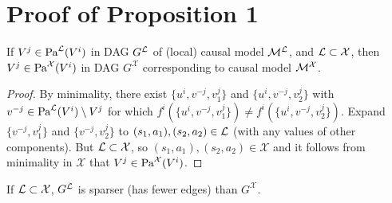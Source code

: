 \documentclass[coda.tex]{subfiles}
\begin{document}
\appendix

\section{Proof of Proposition 1}\label{appdx_proposition}

\begin{lemma}
If $V^j \in \textrm{Pa}^{\mathcal{L}}(V^i)$ in DAG $G^{\mathcal{L}}$ of (local) causal model $\mathcal{M}^{\mathcal{L}}$, and $\mathcal{L} \subset \mathcal{X}$, then $V^j \in \textrm{Pa}^\mathcal{X}(V^i)$ in DAG $G^\mathcal{X}$ corresponding to causal model $\mathcal{M}^\mathcal{X}$. 
\end{lemma}
\vspace{-\baselineskip}
\begin{proof}
By minimality, there exist $\{u^i, v^{-j}, v^j_1\}$ and $\{u^i, v^{-j}, v^j_2 \}$ with $v^{-j} \in \textrm{Pa}^{\mathcal{L}}(V^i)\setminus V^j$ for which $f^i(\{u^i, v^{-j}, v^j_1\}) \not= f^i(\{u^i, v^{-j}, v^j_2 \})$. Expand $\{v^{-j}, v^j_1\}$ and $\{v^{-j}, v^j_2\}$ to $(s_1, a_1), (s_2, a_2) \in \mathcal{L}$ (with any values of other components). But $\mathcal{L} \subset \mathcal{X}$, so $(s_1, a_1), (s_2, a_2) \in \mathcal{X}$ and it follows from minimality in $\mathcal{X}$ that $V^j \in \textrm{Pa}^\mathcal{X}(V^i)$.
\end{proof}

\begin{corollary}\label{corollary_sparser}
If $\mathcal{L} \subset \mathcal{X}$, $G^{\mathcal{L}}$ is sparser (has fewer edges) than $G^\mathcal{X}$. 
\end{corollary}\vspace{\baselineskip}
\end{document}

